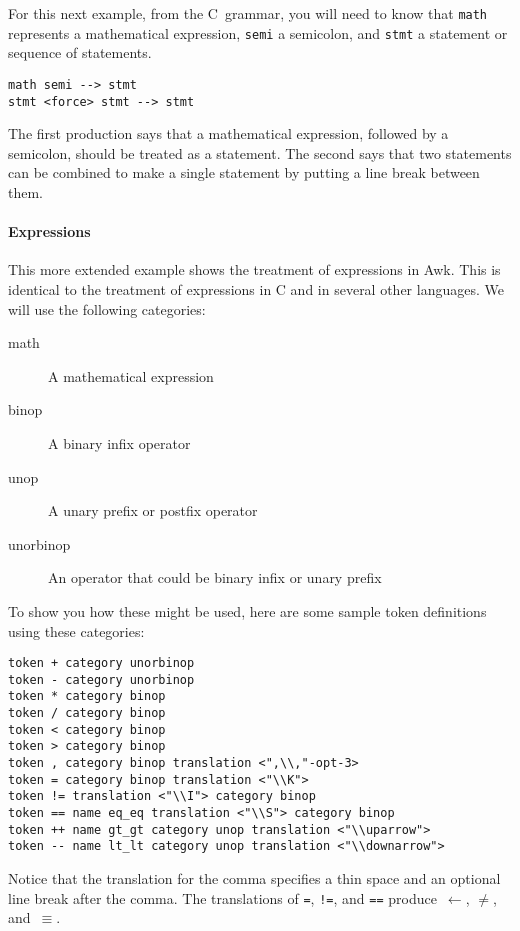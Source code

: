 For this next example, from the C~grammar, you will need to know that 
{\tt math} represents a mathematical expression, {\tt semi} a
semicolon, and {\tt stmt} a statement or sequence of statements.
\begin{verbatim}
math semi --> stmt
stmt <force> stmt --> stmt
\end{verbatim}
The first production says that a mathematical expression, followed by
a semicolon, should be treated as a statement.
The second says that two statements can be combined to make a single
statement by putting a line break between them.

\paragraph{Expressions}
This more extended example shows the treatment of expressions in Awk.
This is identical to the treatment of expressions in C and in several
other languages.
We will use the following categories:
\begin{description}
\item[math] A mathematical expression
\item[binop] A binary infix operator
\item[unop] A unary prefix or postfix operator
\item[unorbinop] An operator that could be binary infix or unary
prefix
\end{description}
To show you how these might be used, here are some sample token
definitions using these categories:
\begin{verbatim}
token + category unorbinop
token - category unorbinop
token * category binop
token / category binop
token < category binop
token > category binop
token , category binop translation <",\\,"-opt-3>
token = category binop translation <"\\K">
token != translation <"\\I"> category binop
token == name eq_eq translation <"\\S"> category binop
token ++ name gt_gt category unop translation <"\\uparrow">
token -- name lt_lt category unop translation <"\\downarrow">
\end{verbatim}
Notice that the translation for the comma specifies a thin space and
an optional line break after the comma.
The translations of {\tt =},  {\tt !=}, and {\tt ==} 
produce~$\leftarrow$, $\ne$, and~$\equiv$. 

